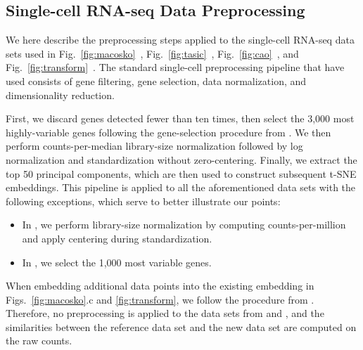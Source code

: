 \documentclass[article]{jss}
\begin{document}
\begin{appendix}

\section{Single-cell RNA-seq Data Preprocessing}

We here describe the preprocessing steps applied to the single-cell RNA-seq data sets used in Fig.~\ref{fig:macosko}~\citep{macosko2015highly}, Fig.~\ref{fig:tasic}~\citep{tasic2018shared}, Fig.~\ref{fig:cao}~\citep{cao2019single}, and Fig.~\ref{fig:transform}~\citep{hochgerner2018conserved}. The standard single-cell preprocessing pipeline that have used consists of gene filtering, gene selection, data normalization, and dimensionality reduction.

First, we discard genes detected fewer than ten times, then select the 3,000 most highly-variable genes following the gene-selection procedure from \citet{kobak2019art}. We then perform counts-per-median library-size normalization followed by log normalization and standardization without zero-centering. Finally, we extract the top 50 principal components, which are then used to construct subsequent t-SNE embeddings. This pipeline is applied to all the aforementioned data sets with the following exceptions, which serve to better illustrate our points:
\begin{itemize}
  \item In \citet{macosko2015highly}, we perform library-size normalization by computing counts-per-million and apply centering during standardization.
  \item In \citet{hochgerner2018conserved}, we select the 1,000 most variable genes.
\end{itemize}

When embedding additional data points into the existing embedding in Figs.~\ref{fig:macosko}.c and \ref{fig:transform}, we follow the procedure from \citet{policar2021embedding}. Therefore, no preprocessing is applied to the data sets from \citet{shekhar2016comprehensive} and \citet{harris2018classes}, and the similarities between the reference data set and the new data set are computed on the raw counts.

\end{appendix}
\end{document}
